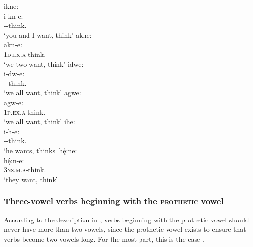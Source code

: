 \ea\label{ex:proth2}
\ea ikne:\\
\gll i-kn-e:\\
 {\prothetic}--think.{\stative}\\
\glt `you and I want, think'
\ex akne:\\
\gll akn-e:\\
 \textsc{1d.ex.a}-think.{\stative}\\
\glt `we two want, think'
\ex idwe:\\
\gll i-dw-e:\\
 {\prothetic}--think.{\stative}\\
\glt `we all want, think'
\ex agwe:\\
\gll agw-e:\\
 \textsc{1p.ex.a}-think.{\stative}\\
\glt `we all want, think'
\ex ihe:\\
\gll i-h-e:\\
 {\prothetic}--think.{\stative}\\
\glt `he wants, thinks'
\ex hę́:ne:\\
\gll hę́:n-e:\\
 \textsc{3ns.m.a}-think.{\stative}\\
\glt `they want, think'
\z
\z


\subsubsection*{Three-vowel verbs beginning with the \textsc{prothetic} vowel} \label{Three-vowel verbs beginning with euphonic I}
According to the description in , verbs beginning with the prothetic vowel should never have more than two vowels, since the prothetic vowel exists to ensure that verbs become two vowels long. For the most part, this is the case .


